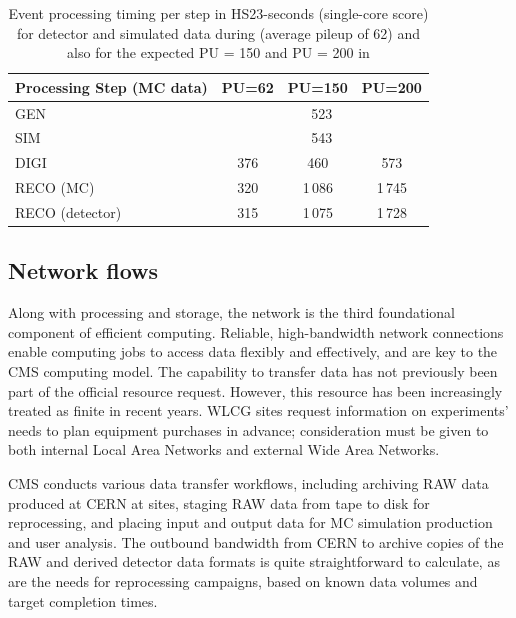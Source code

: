 \begin{table}[tbhp]
    \centering
    \caption{Event processing timing per step in HS23-seconds (single-core score) for detector and simulated data during \RunThree (average pileup of 62) and also for the expected \gls{PU} = 150 and \gls{PU} = 200 in \PhaseTwo}
    \begin{tabular}{|l|c|c|c|}
    \hline
    \rowcolor{tableheader} 
           Processing Step (MC data) & PU=62       & PU=150  & \gls{PU}=200  \\ \hline
    \cellcolor{tablerowheader}
               GEN                   & \multicolumn{3}{c|}{523}    \\ \hline
    \cellcolor{tablerowheader}
               SIM                   & \multicolumn{3}{c|}{543}    \\ \hline
    \cellcolor{tablerowheader}
               DIGI                  &  376               &  460          & 573  \\ \hline 
    \cellcolor{tablerowheader}
               RECO (MC)       &  320    & 1\,086        & 1\,745   \\ \hline
    \cellcolor{tablerowheader}
       RECO (detector)               &    315         &   1\,075      & 1\,728    \\ \hline
    \end{tabular}
    \label{tab:event-timing-simulation}
\end{table}

\subsection{Network flows}
\label{sec:Bandwidth}

Along with processing and storage, the network is the third foundational component of efficient computing. 
Reliable, high-bandwidth network connections enable computing jobs to access data flexibly and effectively, and are key to the CMS computing model. The capability to transfer data has not previously been part of the official resource request. However, this resource has been increasingly treated as finite in recent years. \gls{WLCG} sites request information on experiments’ needs to plan equipment purchases in advance; consideration must be given to both internal Local Area Networks and external Wide Area Networks.

CMS conducts various data transfer workflows, including archiving \gls{RAW} data produced at CERN at \TierOne sites, staging \gls{RAW} data from tape to disk for reprocessing, and placing input and output data for \gls{MC} simulation production and user analysis. The outbound bandwidth from CERN to archive copies of the \gls{RAW} and derived detector data formats is quite straightforward to calculate, as are the needs for reprocessing campaigns, based on known data volumes and target completion times.

